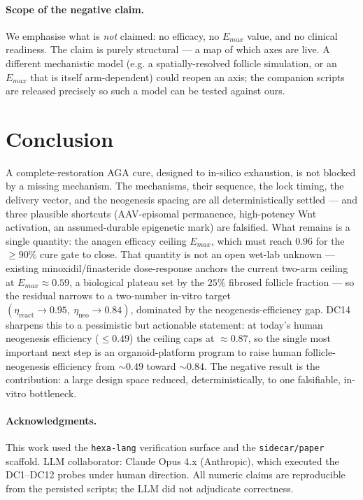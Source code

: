 \documentclass[11pt,a4paper]{article}
\begin{document}
\paragraph{Scope of the negative claim.} We emphasise what is \emph{not} claimed:
no efficacy, no $E_{max}$ value, and no clinical readiness. The claim is purely
structural --- a map of which axes are live. A different mechanistic model (e.g. a
spatially-resolved follicle simulation, or an $E_{max}$ that is itself
arm-dependent) could reopen an axis; the companion scripts are released precisely
so such a model can be tested against ours.

\section{Conclusion}
\label{sec:conclusion}

A complete-restoration AGA cure, designed to in-silico exhaustion, is not blocked by
a missing mechanism. The mechanisms, their sequence, the lock timing, the delivery
vector, and the neogenesis spacing are all deterministically settled --- and three
plausible shortcuts (AAV-episomal permanence, high-potency Wnt activation, an
assumed-durable epigenetic mark) are falsified. What remains is a single
quantity: the anagen efficacy ceiling $E_{max}$, which must reach $0.96$ for the
$\geq 90\%$ cure gate to close. That quantity is not an open wet-lab unknown ---
existing minoxidil/finasteride dose-response anchors the current two-arm ceiling at
$E_{max}\approx 0.59$, a biological plateau set by the $25\%$ fibrosed follicle
fraction --- so the residual narrows to a two-number in-vitro target
$(\eta_{\text{react}}{\to}0.95,\ \eta_{\text{neo}}{\to}0.84)$, dominated by the
neogenesis-efficiency gap. DC14 sharpens this to a pessimistic but actionable
statement: at today's human neogenesis efficiency ($\leq 0.49$) the ceiling caps at
$\approx 0.87$, so the single most important next step is an organoid-platform
program to raise human follicle-neogenesis efficiency from ${\sim}0.49$ toward
${\sim}0.84$. The negative result is the contribution: a large design space reduced,
deterministically, to one falsifiable, in-vitro bottleneck.

\paragraph{Acknowledgments.}
This work used the \texttt{hexa-lang} verification surface and the
\texttt{sidecar/paper} scaffold. LLM collaborator: Claude Opus 4.x (Anthropic),
which executed the DC1--DC12 probes under human direction. All numeric claims are
reproducible from the persisted scripts; the LLM did not adjudicate correctness.
\end{document}
